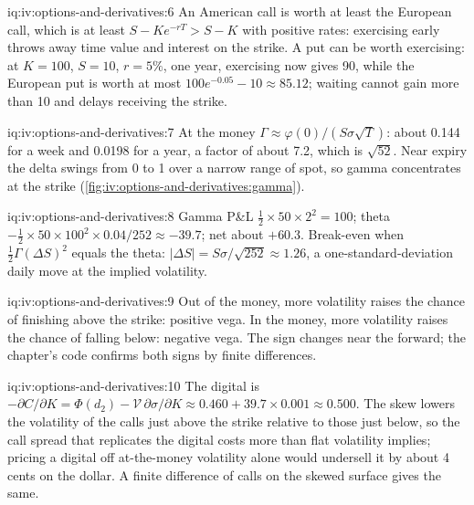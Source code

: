 \begin{solution}{iq:iv:options-and-derivatives:6}
An American call is worth at least the European call, which is at least $S - Ke^{-rT} > S - K$ with positive rates:
exercising early throws away time value and interest on the strike. A put can be worth exercising: at $K = 100$, $S = 10$,
$r = 5\%$, one year, exercising now gives 90, while the European put is worth at most $100e^{-0.05} - 10 \approx 85.12$;
waiting cannot gain more than 10 and delays receiving the strike.
\end{solution}

\begin{solution}{iq:iv:options-and-derivatives:7}
At the money $\Gamma \approx \varphi(0)/(S\sigma\sqrt T)$: about 0.144 for a week and 0.0198 for a year, a factor of about
7.2, which is $\sqrt{52}$. Near expiry the delta swings from 0 to 1 over a narrow range of spot, so gamma concentrates at
the strike (\cref{fig:iv:options-and-derivatives:gamma}).
\end{solution}

\begin{solution}{iq:iv:options-and-derivatives:8}
Gamma P\&L $\tfrac12 \times 50 \times 2^2 = 100$; theta $-\tfrac12 \times 50 \times 100^2 \times 0.04/252 \approx -39.7$;
net about $+60.3$. Break-even when $\tfrac12\Gamma(\Delta S)^2$ equals the theta: $|\Delta S| = S\sigma/\sqrt{252} \approx
1.26$, a one-standard-deviation daily move at the implied volatility.
\end{solution}

\begin{solution}{iq:iv:options-and-derivatives:9}
Out of the money, more volatility raises the chance of finishing above the strike: positive vega. In the money, more
volatility raises the chance of falling below: negative vega. The sign changes near the forward; the chapter's code confirms
both signs by finite differences.
\end{solution}

\begin{solution}{iq:iv:options-and-derivatives:10}
The digital is $-\partial C/\partial K = \Phi(d_2) - \mathcal V\,\partial\sigma/\partial K \approx 0.460 + 39.7 \times 0.001
\approx 0.500$. The skew lowers the volatility of the calls just above the strike relative to those just below, so the call
spread that replicates the digital costs more than flat volatility implies; pricing a digital off at-the-money volatility
alone would undersell it by about 4 cents on the dollar. A finite difference of calls on the skewed surface gives the same.
\end{solution}

